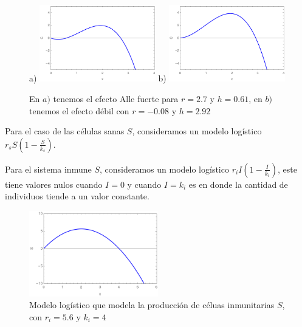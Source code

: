 \documentclass{article}
\begin{document}
\begin{figure}[ht]
 \centering
  {
   \label{fig:strong_allee}
a)    \includegraphics[width=0.45\textwidth]{images/strong_allee.png}}
  {
   \label{fig:weak_allee}
b)    \includegraphics[width=0.45\textwidth]{images/allee_weak.png}}
  
 \caption{En $a)$ tenemos el efecto Alle fuerte para $r=2.7$ y $h=0.61$, en $b)$ tenemos el efecto débil con $r=-0.08$ y $h=2.92$}
 \label{fig:allee_plots}
\end{figure}


Para el caso de las células sanas $S$, consideramos un modelo logístico $r_s S (1 - \frac{S}{k_s})$. 

Para el sistema inmune $S$, consideramos un modelo logístico $r_i I(1-\frac{I}{k_i})$, este tiene valores nulos cuando $I=0$ y cuando $I=k_i$ es en donde la cantidad de individuos tiende a un valor constante.

\begin{figure}[ht]
    \centering
    \includegraphics[width=0.5\textwidth]{images/logistic.png}
    \caption{Modelo logístico que modela la producción de céluas inmunitarias $S$, con $r_i=5.6 $ y $k_i=4$}
    \label{fig:logistic}
\end{figure}
\end{document}
